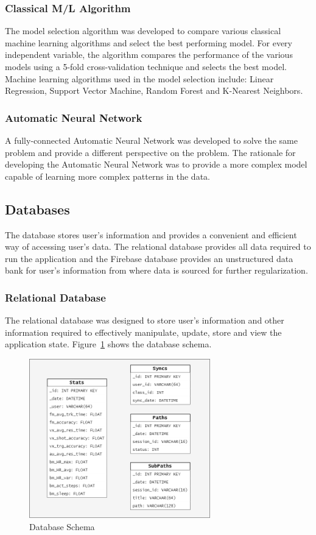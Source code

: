 \subsubsection{Classical M/L Algorithm} 
The model selection algorithm was developed to compare various classical machine learning algorithms and select the best performing model. For
every independent variable, the algorithm compares the performance of the various models using a 5-fold cross-validation technique and selects
the best model. Machine learning algorithms used in the model selection include: Linear Regression, Support Vector Machine, Random Forest and 
K-Nearest Neighbors. 

\subsubsection{Automatic Neural Network}

A fully-connected Automatic Neural Network was developed to solve the same problem and provide a different perspective on the problem. The
rationale for developing the Automatic Neural Network was to provide a more complex model capable of learning more complex patterns in the data.


\subsection{Databases}
The database stores user's information and provides a convenient and efficient way of accessing user's data. The relational database provides all
data required to run the application and the Firebase database provides an unstructured data bank for user's information from where data is sourced
for further regularization. 
\subsubsection{Relational Database}
The relational database was designed to store user's information and other information required to effectively manipulate, update, store and view 
the application state. Figure~\ref{image:db_schema} shows the database schema. 
\begin{figure}[h!]
    \centering
    \includegraphics[width=0.7\textwidth]{images/db_schema.png}
    \caption{Database Schema}
    \label{image:db_schema}
\end{figure}
